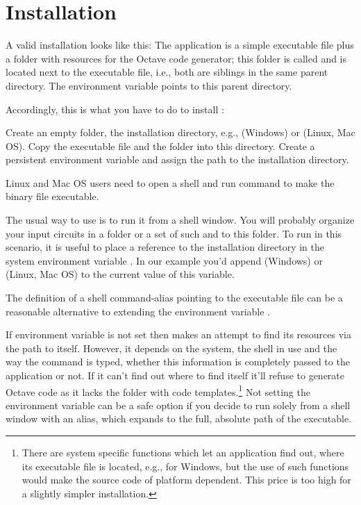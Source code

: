 \chapter{Installation}

A valid \linnet{} installation looks like this: The \linnet{} application
is a simple executable file plus a folder with resources for the Octave
code generator; this folder is called  and is located next
to the \linnet{} executable file, i.e., both are siblings in the same
parent directory. The environment variable  points to
this parent directory.

Accordingly, this is what you have to do to install \linnet{}:

Create an empty folder, the installation directory, e.g.,
 (Windows) or 
(Linux, Mac OS). Copy the \linnet{} executable file and the folder
 into this directory. Create a persistent environment
variable  and assign the path to the installation
directory.

Linux and Mac OS users need to open a shell and run command  to make the binary file executable.

The usual way to use \linnet{} is to run it from a shell window. You will
probably organize your input circuits in a folder or a set of such and
 to this folder. To run \linnet{} in this scenario, it is useful to place a reference to the installation
directory in the system environment variable . In our example
you'd append  (Windows) or
 (Linux, Mac OS) to the current value of this
variable.

The definition of a shell command-alias pointing to the \linnet{}
executable file can be a reasonable alternative to extending the
environment variable .

If environment variable  is not set then \linnet{}
makes an attempt to find its resources via the path to itself. However, it
depends on the system, the shell in use and the way the command is typed,
whether this information is completely passed to the application or not.
If it can't find out where to find itself it'll refuse to generate Octave
code as it lacks the folder  with code
templates.\footnote{There are system specific functions which let an
application find out, where its executable file is located, e.g.,
 for Windows, but the use of such functions would
make the source code of \linnet{} platform dependent. This price is too
high for a slightly simpler installation.} Not setting the environment
variable can be a safe option if you decide to run \linnet{} solely from a
shell window with an alias, which expands to the full, absolute path of
the executable.

